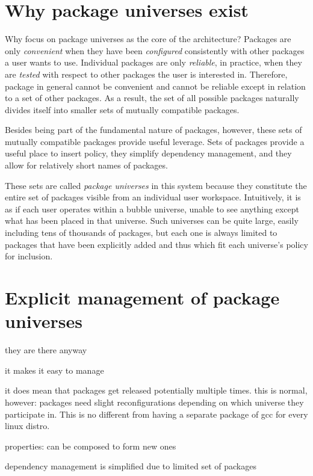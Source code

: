 \documentclass{article}
\begin{document}
\section{Why package universes exist}


Why focus on package universes as the core of the architecture?
Packages are only \emph{convenient} when they have been
\emph{configured} consistently with other packages a user wants to
use.  Individual packages are only \emph{reliable}, in practice, when
they are \emph{tested} with respect to other packages the user is
interested in.  Therefore, package in general cannot be convenient and
cannot be reliable except in relation to a set of other packages.
As a result, the set of all possible packages naturally divides itself into
smaller sets of mutually compatible packages.

Besides being part of the fundamental nature of packages, however,
these sets of mutually compatible packages provide useful leverage.
Sets of packages provide a useful place to insert policy, they
simplify dependency management, and they allow for relatively short
names of packages.

These sets are called \emph{package universes} in this system because
they constitute the entire set of packages visible from an individual
user workspace.  Intuitively, it is as if each user operates within a
bubble universe, unable to see anything except what has been placed in
that universe.  Such universes can be quite large, easily including
tens of thousands of packages, but each one is always limited to
packages that have been explicitly added and thus which fit each
universe's policy for inclusion.



\section{Explicit management of package universes}
    they are there anyway

    it makes it easy to manage

    it does mean that packages get released potentially multiple times.
    this is normal, however: packages need slight reconfigurations depending
    on which universe they participate in.  This is no different from
    having a separate package of gcc for every linux distro.

properties:
  can be composed to form new ones

  dependency management is simplified due to limited set of packages
\end{document}

